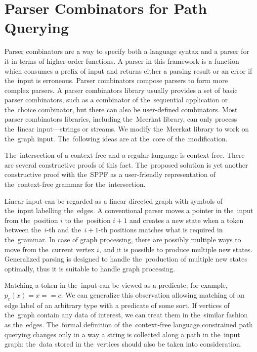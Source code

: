 \section{Parser Combinators for Path Querying}
\label{sec:combinators}

Parser combinators are a way to specify both a language syntax and a parser for it in terms of higher-order functions.
A parser in this framework is a function which consumes a prefix of input and returns either a parsing result or an error if the~input is erroneous.
Parser combinators compose parsers to form more complex parsers.
A parser combinators library usually provides a set of basic parser combinators, such as a combinator of the~sequential application or the~choice combinator, but there can also be user-defined combinators.
Most parser combinators libraries, including the~Meerkat library, can only process the~linear input---strings or streams.
We modify the~Meerkat library to work on the~graph input. The~following ideas are at the~core of the~modification.

The~intersection of a context-free and a regular language is context-free. There are several constructive proofs of this fact.
The~proposed solution is yet another constructive proof with the~SPPF as a user-friendly representation of the~context-free grammar for the~intersection.

Linear input can be regarded as a linear directed graph with symbols of the~input labelling the~edges.
A conventional parser moves a pointer in the~input from the~position $i$ to the~position $i+1$ and creates a new state when a token between the~$i$-th and the~$i+1$-th positions matches what is required in the~grammar.
In case of graph processing, there are possibly multiple ways to move from the~current vertex $i$, and it is possible to produce multiple new states.
Generalized parsing is designed to handle the~production of multiple new states optimally, thus it is suitable
 to handle graph processing.

Matching a token in the~input can be viewed as a predicate, for example, $p_c (x) = x == c$.
We can generalize this observation allowing matching of an edge label of an arbitrary type with a predicate of some sort.
If vertices of the~graph contain any data of interest, we can treat them in the~similar fashion as the~edges.
The~formal definition of the~context-free language constrained path querying changes only in a way a string is collected along a path in the~input graph: the~data stored in the~vertices should also be taken into consideration.

